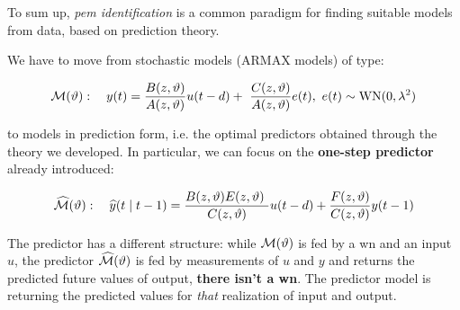 
To sum up, \textit{\gls{pem} identification} is a common paradigm for finding suitable models from data, based on prediction theory.

We have to move from stochastic models (ARMAX models) of type: 

$$
\Mc(\theta):\quad
y(t) = \frac{B(z,\theta)}{A(z,\theta)} u(t-d) +\ \frac{C(z,\theta)}{A(z,\theta)} e(t) ,\ e(t)\sim \WN(0,\lambda ^{2})
$$

to models in prediction form, i.e. the optimal predictors obtained through the theory we developed. In particular, we can focus on the \textbf{one-step predictor} already introduced:

$$
\widehat{\mathcal{M}}(\vartheta):\quad
\widehat{y}(t\mid t-1) = \frac{B(z,\vartheta) E(z,\vartheta) \ }{C(z,\vartheta)} u(t-d) + \frac{F(z,\vartheta)}{C(z,\vartheta)} y(t-1)
$$

The predictor has a different structure: while $ \mathcal{M}(\vartheta)$ is fed by a \gls{wn} and an input $u$, the predictor $\widehat{\mathcal{M}}(\vartheta)$ is fed by measurements of $u$ and $y$ and returns the predicted future values of output, \textbf{there isn't a \gls{wn}}. The predictor model is returning the predicted values for \textit{that} realization of input and output.

\begin{figure}[htpb]
	\centering
	\begin{subfigure}{.5\textwidth}
		\centering
	\end{subfigure}%
	\begin{subfigure}{.5\textwidth}
		\centering
	\end{subfigure}
\end{figure}
\FloatBarrier

